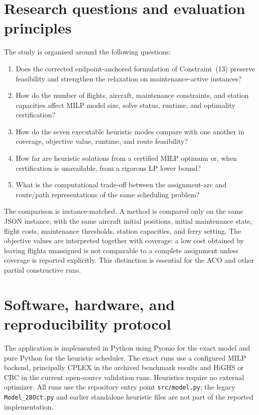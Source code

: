 \section{Research questions and evaluation principles}
\label{sec:computational_questions}

The study is organised around the following questions:

\begin{enumerate}
    \item Does the corrected endpoint-anchored formulation of Constraint~(13)
    preserve feasibility and strengthen the relaxation on maintenance-active
    instances?
    \item How do the number of flights, aircraft, maintenance constraints, and
    station capacities affect MILP model size, solve status, runtime, and
    optimality certification?
    \item How do the seven executable heuristic modes compare with one another
    in coverage, objective value, runtime, and route feasibility?
    \item How far are heuristic solutions from a certified MILP optimum or,
    when certification is unavailable, from a rigorous LP lower bound?
    \item What is the computational trade-off between the assignment-arc and
    route/path representations of the same scheduling problem?
\end{enumerate}

The comparison is instance-matched. A method is compared only on the same JSON
instance, with the same aircraft initial positions, initial maintenance state,
flight costs, maintenance thresholds, station capacities, and ferry setting.
The objective values are interpreted together with coverage: a low cost obtained
by leaving flights unassigned is not comparable to a complete assignment unless
coverage is reported explicitly. This distinction is essential for the ACO and
other partial constructive runs.

\section{Software, hardware, and reproducibility protocol}
\label{sec:computational_protocol}

The application is implemented in Python using Pyomo for the exact model and
pure Python for the heuristic scheduler. The exact runs use a configured MILP
backend, principally CPLEX in the archived benchmark results and HiGHS or CBC
in the current open-source validation runs. Heuristics require no external
optimizer. All runs use the repository entry point \texttt{src/model.py}; the
legacy \texttt{Model\_28Oct.py} and earlier standalone heuristic files are not
part of the reported implementation.

